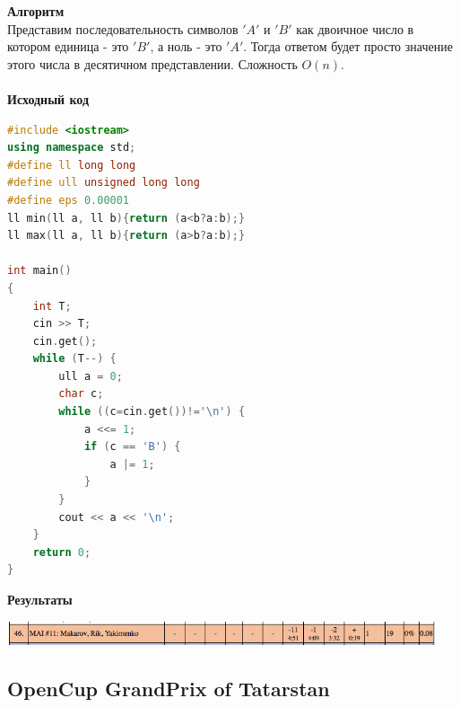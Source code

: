 \documentclass[a4paper,12pt]{article}
\begin{document}
\textbf{{\large Алгоритм}} \\
Представим последовательность символов $'A'$ и $'B'$ как двоичное число в котором единица - это $'B'$, а ноль - это $'A'$. Тогда ответом будет просто значение этого числа в десятичном представлении. Сложность $O(n)$. \\ 
\\
\textbf{{\large Исходный код}}
\begin{lstlisting}[language=C++]
#include <iostream>
using namespace std;
#define ll long long
#define ull unsigned long long
#define eps 0.00001
ll min(ll a, ll b){return (a<b?a:b);}
ll max(ll a, ll b){return (a>b?a:b);}

int main()
{
    int T;
    cin >> T;
    cin.get();
    while (T--) {
        ull a = 0;
        char c;
        while ((c=cin.get())!='\n') {
            a <<= 1;
            if (c == 'B') {
                a |= 1;
            }
        }
        cout << a << '\n';
    }
    return 0;
}
\end{lstlisting}

\textbf{{\large Результаты}} \\
\begin{center}
\includegraphics[width=0.95\textwidth]{OC_China/OC_China_result.png}\\ [1cm]
\end{center}



%
%
\newpage
\subsection{OpenCup GrandPrix of Tatarstan}
\end{document}

